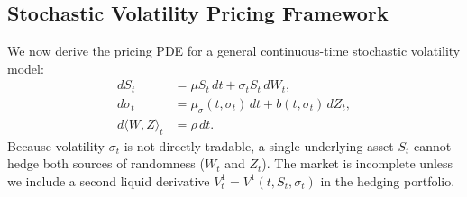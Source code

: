 \subsection{Stochastic Volatility Pricing Framework}
We now derive the pricing PDE for a general continuous-time stochastic volatility model:
\begin{align*}
    dS_t &= \mu S_t\,dt + \sigma_t S_t\,dW_t, \\
    d\sigma_t &= \mu_{\sigma}(t, \sigma_t)\,dt + b(t, \sigma_t)\,dZ_t, \\
    d\langle W, Z \rangle_t &= \rho\,dt.
\end{align*}
Because volatility $\sigma_t$ is not directly tradable, a single underlying asset $S_t$ cannot hedge both sources of randomness ($W_t$ and $Z_t$). The market is incomplete unless we include a second liquid derivative $V_t^1 = V^1(t, S_t, \sigma_t)$ in the hedging portfolio.

